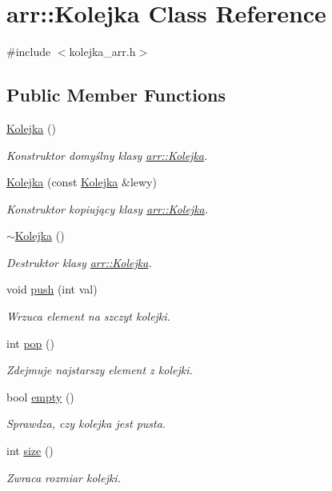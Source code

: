 \hypertarget{classarr_1_1_kolejka}{\section{arr\-:\-:Kolejka Class Reference}
\label{classarr_1_1_kolejka}
}


{\ttfamily \#include $<$kolejka\-\_\-arr.\-h$>$}

\subsection*{Public Member Functions}
\begin{DoxyCompactItemize}
\item 
\hyperlink{classarr_1_1_kolejka_a7f2d0e05c25b3a0d10db8e04cd4bdb58}{Kolejka} ()
\begin{DoxyCompactList}\small\item\em Konstruktor domyślny klasy \hyperlink{classarr_1_1_kolejka}{arr\-::\-Kolejka}. \end{DoxyCompactList}\item 
\hyperlink{classarr_1_1_kolejka_a1addd7f5fdee63f093fd971037600b02}{Kolejka} (const \hyperlink{classarr_1_1_kolejka}{Kolejka} \&lewy)
\begin{DoxyCompactList}\small\item\em Konstruktor kopiujący klasy \hyperlink{classarr_1_1_kolejka}{arr\-::\-Kolejka}. \end{DoxyCompactList}\item 
\hyperlink{classarr_1_1_kolejka_a455a5aac4ea9612cab749b8e9edf131d}{$\sim$\-Kolejka} ()
\begin{DoxyCompactList}\small\item\em Destruktor klasy \hyperlink{classarr_1_1_kolejka}{arr\-::\-Kolejka}. \end{DoxyCompactList}\item 
void \hyperlink{classarr_1_1_kolejka_acb08e887411da797ab39960cde892dc5}{push} (int val)
\begin{DoxyCompactList}\small\item\em Wrzuca element na szczyt kolejki. \end{DoxyCompactList}\item 
int \hyperlink{classarr_1_1_kolejka_a9d2c0676d6992ffb3b2aa4cd27ca36af}{pop} ()
\begin{DoxyCompactList}\small\item\em Zdejmuje najstarszy element z kolejki. \end{DoxyCompactList}\item 
bool \hyperlink{classarr_1_1_kolejka_a8ed4d617d36bf539544d1f7e18929bf8}{empty} ()
\begin{DoxyCompactList}\small\item\em Sprawdza, czy kolejka jest pusta. \end{DoxyCompactList}\item 
int \hyperlink{classarr_1_1_kolejka_a1aabde2dffcb50f4d8dc2e7d6df808ce}{size} ()
\begin{DoxyCompactList}\small\item\em Zwraca rozmiar kolejki. \end{DoxyCompactList}\end{DoxyCompactItemize}
